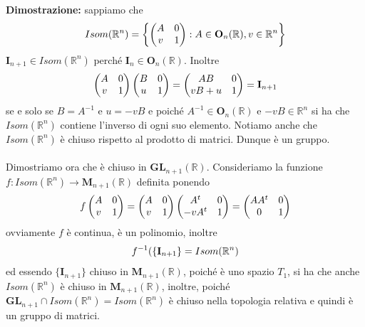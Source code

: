 \documentclass{article}
\begin{document}
\textbf{Dimostrazione:} sappiamo che
\begin{gather}
    Isom(\mathbb{R}^n) = \left\{ \begin{pmatrix}
        A & 0 \\
        v & 1
    \end{pmatrix} : A \in \mathbf{O}_n(\mathbb{R}), v \in \mathbb{R}^n \right\} \notag
\end{gather}
$\mathbf{I}_{n + 1} \in Isom(\mathbb{R}^n)$ perché $\mathbf{I}_n \in \mathbf{O}_n(\mathbb{R})$. Inoltre
\begin{gather}
    \begin{pmatrix}
        A & 0 \\
        v & 1
    \end{pmatrix}
    \begin{pmatrix}
        B & 0 \\
        u & 1
    \end{pmatrix} =
    \begin{pmatrix}
        AB & 0 \\
        vB + u & 1
    \end{pmatrix} =
    \mathbf{I}_{n + 1} \notag
\end{gather}
se e solo se $B = A^{-1} \text{ e } u = -vB$ e poiché $A^{-1} \in \mathbf{O}_n(\mathbb{R})$ e $-vB \in \mathbb{R}^n$ si ha che $Isom(\mathbb{R}^n)$ contiene l'inverso di ogni suo elemento. Notiamo anche che $Isom(\mathbb{R}^n)$ è chiuso rispetto al prodotto di matrici. Dunque è un gruppo. \\ \\
Dimostriamo ora che è chiuso in $\mathbf{GL}_{n + 1}(\mathbb{R})$. Consideriamo la funzione \\
$f : Isom(\mathbb{R}^n) \longrightarrow \mathbf{M}_{n + 1}(\mathbb{R})$ definita ponendo
\begin{gather}
    f \begin{pmatrix}
        A & 0 \\
        v & 1
    \end{pmatrix} =
    \begin{pmatrix}
        A & 0 \\
        v & 1
    \end{pmatrix}
    \begin{pmatrix}
        A^t & 0 \\
        -vA^t & 1
    \end{pmatrix} =
    \begin{pmatrix}
        AA^t & 0 \\
        0 & 1
    \end{pmatrix} \notag
\end{gather}
ovviamente $f$ è continua, è un polinomio, inoltre
\begin{gather}
    f^{-1}(\{ \mathbf{I}_{n + 1} \} = Isom(\mathbb{R}^n) \notag
\end{gather}
ed essendo $\{ \mathbf{I}_{n + 1} \}$ chiuso in $\mathbf{M}_{n + 1}(\mathbb{R})$, poiché è uno spazio $T_1$, si ha che anche $Isom(\mathbb{R}^n)$ è chiuso in $\mathbf{M}_{n + 1}(\mathbb{R})$, inoltre, poiché $\mathbf{GL}_{n + 1} \cap Isom(\mathbb{R}^n) = Isom(\mathbb{R}^n)$ è chiuso nella topologia relativa e quindi è un gruppo di matrici.
\end{document}
